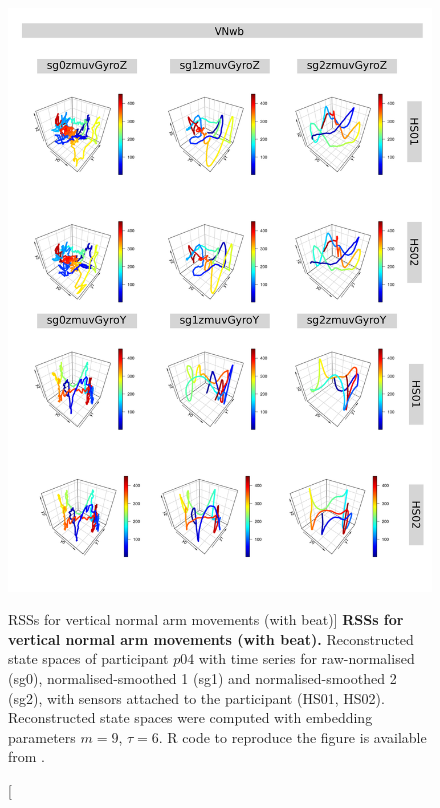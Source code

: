 \begin{figure}
\centering
\includegraphics[height=0.8\textheight]{rss_VNwb_p04}
\caption
	[RSSs for vertical normal arm movements (with beat)]{
	{\bf RSSs for vertical normal arm movements (with beat).}
	Reconstructed state spaces of participant $p04$
	with time series for raw-normalised (sg0), 
	normalised-smoothed 1 (sg1) and 
	normalised-smoothed 2 (sg2), 
	with sensors attached to the participant (HS01, HS02).
	Reconstructed state spaces were computed with 
	embedding parameters $m=9$, $\tau=6$.
	R code to reproduce the figure is available from \cite{xochicale2018}.
        }
     \label{fig:rss_VNwb_p04}
\end{figure}






